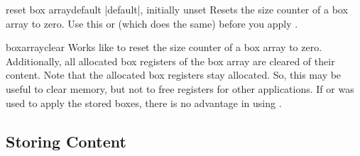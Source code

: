 \begin{docTcbKey}[][doc new=2015-07-13]{reset box array}{}{default |default|, initially unset}
  Resets the size counter of a box array  to zero.
  Use this or  (which does the same) before
  you apply .
\begin{dispListing}
\end{dispListing}
\end{docTcbKey}

\clearpage
\begin{docCommand}[doc new=2015-07-13]{boxarrayclear}{}
  Works like  to reset the size counter of a
  box array  to zero. Additionally, all allocated box registers
  of the box array are cleared of their content.
  Note that the allocated box registers stay allocated. So, this may be
  useful to clear memory, but not to free registers for other applications.
  If  or  was used to
  apply the stored boxes, there is no advantage in using .
\begin{dispListing}
\boxarrayclear            %
\end{dispListing}
\end{docCommand}



\subsection{Storing Content}\label{subsec:magazine_storing}


